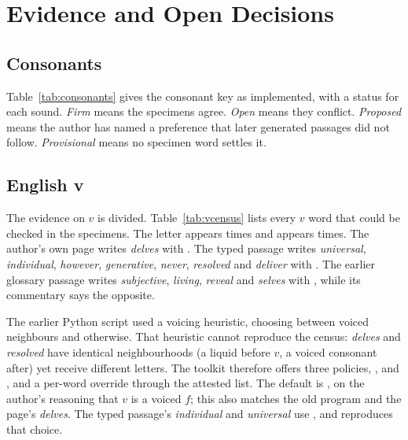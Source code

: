 \chapter{Evidence and Open Decisions}\label{ch:evidence}

\section{Consonants}
Table~\ref{tab:consonants} gives the consonant key as implemented, with a status for each sound. \emph{Firm} means the specimens agree. \emph{Open} means they conflict. \emph{Proposed} means the author has named a preference that later generated passages did not follow. \emph{Provisional} means no specimen word settles it.

\begin{table}[ht]\centering\small

\caption{Consonant key (default profile). English $p$ is written  in every specimen.}\label{tab:consonants}
\end{table}

\section{English v}
The evidence on $v$ is divided. Table~\ref{tab:vcensus} lists every $v$ word that could be checked in the specimens. The letter  appears \VCensusB{} times and  appears \VCensusF{} times. The author's own page writes \emph{delves} with . The typed passage writes \emph{universal}, \emph{individual}, \emph{however}, \emph{generative}, \emph{never}, \emph{resolved} and \emph{deliver} with . The earlier glossary passage writes \emph{subjective}, \emph{living}, \emph{reveal} and \emph{selves} with , while its commentary says the opposite.

\begin{table}[ht]\centering\small

\caption{Census of English $v$ in the specimens that could be aligned.}\label{tab:vcensus}
\end{table}

The earlier Python script used a voicing heuristic, choosing  between voiced neighbours and  otherwise. That heuristic cannot reproduce the census: \emph{delves} and \emph{resolved} have identical neighbourhoods (a liquid before $v$, a voiced consonant after) yet receive different letters. The toolkit therefore offers three policies, ,  and , and a per-word override through the attested list. The default is , on the author's reasoning that $v$ is a voiced $f$; this also matches the old program and the page's \emph{delves}. The typed passage's \emph{individual} and \emph{universal} use , and  reproduces that choice.

